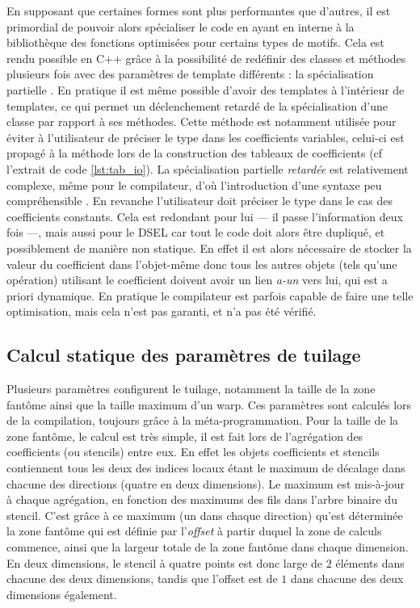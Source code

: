 En supposant que certaines formes sont plus performantes que d'autres, il est primordial de pouvoir alors spécialiser le code en ayant en interne à la bibliothèque des fonctions optimisées pour certains types de motifs. Cela est rendu possible en \textsf{C++} grâce à la possibilité de redéfinir des classes et méthodes plusieurs fois avec des paramètres de template différents : la spécialisation partielle \cite{Web1}. En pratique il est même possible d'avoir des templates à l'intérieur de templates, ce qui permet un déclenchement retardé de la spécialisation d'une classe par rapport à ses méthodes. Cette méthode est notamment utilisée pour éviter à l'utilisateur de préciser le type dans les coefficients variables, celui-ci est propagé à la méthode lors de la construction des tableaux de coefficients (cf l'extrait de code \ref{lst:tab_io}). La spécialisation partielle \emph{retardée} est relativement complexe, même pour le compilateur, d'où l'introduction d'une syntaxe peu compréhensible \cite{Web2}. En revanche l'utilisateur doit préciser le type dans le cas des coefficients constants. Cela est redondant pour lui --- il passe l'information deux fois ---, mais aussi pour le DSEL car tout le code doit alors être dupliqué, et possiblement de manière non statique. En effet il est alors nécessaire de stocker la valeur du coefficient dans l'objet-même donc tous les autres objets (tels qu'une opération) utilisant le coefficient doivent avoir un lien \emph{a-un} vers lui, qui est a priori dynamique. En pratique le compilateur est parfois capable de faire une telle optimisation, mais cela n'est pas garanti, et n'a pas été vérifié.


\subsection{Calcul statique des paramètres de tuilage}
\label{sec:param_tuile}

Plusieurs paramètres configurent le tuilage, notamment la taille de la zone fantôme ainsi que la taille maximum d'un warp. Ces paramètres sont calculés lors de la compilation, toujours grâce à la méta-programmation. Pour la taille de la zone fantôme, le calcul est très simple, il est fait lors de l'agrégation des coefficients (ou stencils) entre eux. En effet les objets coefficients et stencils contiennent tous les deux des indices locaux étant le maximum de décalage dans chacune des directions (quatre en deux dimensions). Le maximum est mis-à-jour à chaque agrégation, en fonction des maximums des fils dans l'arbre binaire du stencil. C'est grâce à ce maximum (un dans chaque direction) qu'est déterminée la zone fantôme qui est définie par l'\emph{offset} à partir duquel la zone de calculs commence, ainsi que la largeur totale de la zone fantôme dans chaque dimension. En deux dimensions, le stencil à quatre points est donc large de $2$ éléments dans chacune des deux dimensions, tandis que l'offset est de $1$ dans chacune des deux dimensions également.

